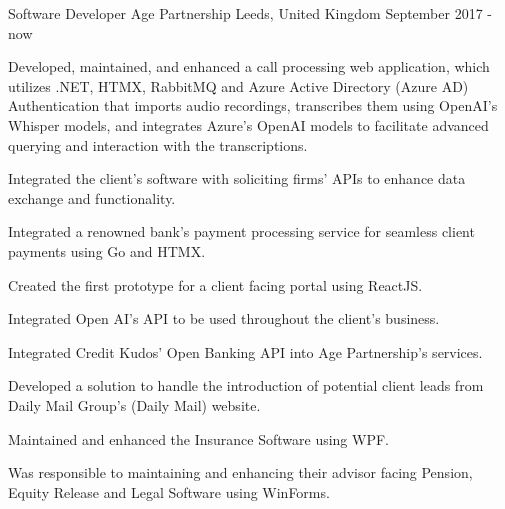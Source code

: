 

\begin{cventries}

  \cventry
    {Software Developer} %
    {Age Partnership} %
    {Leeds, United Kingdom} %
    {September 2017 - now} %
    {
      \begin{cvitems} %
        \item {Developed, maintained, and enhanced a call processing web application, which utilizes .NET, HTMX, RabbitMQ and Azure Active Directory (Azure AD) Authentication that imports audio recordings, transcribes them using OpenAI's Whisper models, and integrates Azure's OpenAI models to facilitate advanced querying and interaction with the transcriptions. }
        \vspace{0.7em} %
         \item {Integrated the client's software with soliciting firms' APIs to enhance data exchange and functionality. }
         \vspace{0.7em} %
        \item {Integrated a renowned bank's payment processing service for seamless client payments using Go and HTMX. }
        \vspace{0.7em} %
        \item {Created the first prototype for a client facing portal using ReactJS. }
        \vspace{0.7em} %
        \item {Integrated Open AI's API to be used throughout the client's business. }
        \item {Integrated Credit Kudos' Open Banking API into Age Partnership's services. }
        \vspace{0.7em} %
        \item {Developed a solution to handle the introduction of potential client leads from Daily Mail Group's (Daily Mail) website. }
        \vspace{0.7em} %
        \item {Maintained and enhanced the Insurance Software using WPF.}
        \vspace{0.7em} %
        \item {Was responsible to maintaining and enhancing their advisor facing Pension, Equity Release and Legal Software using WinForms.}
      \end{cvitems}
    }

\end{cventries}
